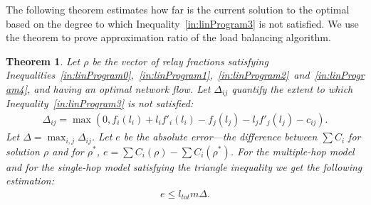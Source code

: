 \documentclass[11pt]{article}
\newcommand{\ltot}{{{l_{\mathit{tot}}}}}
\newtheorem{theorem}{Theorem}
\begin{document}
The following theorem estimates how far is the current solution to the optimal based on the degree to which Inequality~\ref{in:linProgram3} is not satisfied. We use the theorem to prove approximation ratio of the load balancing algorithm.

\begin{theorem}\label{thm:approxBound}
Let $\rho$ be the vector of relay fractions satisfying Inequalities~\ref{in:linProgram0},~\ref{in:linProgram1},~\ref{in:linProgram2}~and~\ref{in:linProgram4}, and having an optimal network flow. Let $\Delta_{ij}$ quantify the extent to which Inequality~\ref{in:linProgram3} is not satisfied:
\begin{align*}
\Delta_{ij} = \max(0, f_{i}(l_i) + l_if'_{i}(l_i) - f_{j}(l_j) - l_jf'_{j}(l_j) - c_{ij}) \textrm{.}
\end{align*}
Let $\Delta = \max_{i, j}\Delta_{ij}$.
Let $e$ be the absolute error---the difference between $\sum{C_i}$ for solution $\rho$ and for  $\rho^{*}$, $e = \sum{C_i}(\rho) - \sum{C_i}(\rho^*)$.
For the multiple-hop model and for the single-hop model satisfying the triangle inequality we get the following estimation:
\begin{align*}
e \leq \ltot m \Delta\textrm{.}
\end{align*}
\end{theorem}
\end{document}
